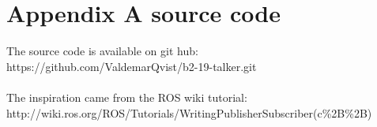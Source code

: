 \chapter{Appendix A source code}\label{ch:appAlabel}

The source code is available on git hub:\\
https://github.com/ValdemarQvist/b2-19-talker.git\\
\\

The inspiration came from the ROS wiki tutorial:\\
http://wiki.ros.org/ROS/Tutorials/WritingPublisherSubscriber(c\%2B\%2B)\\

